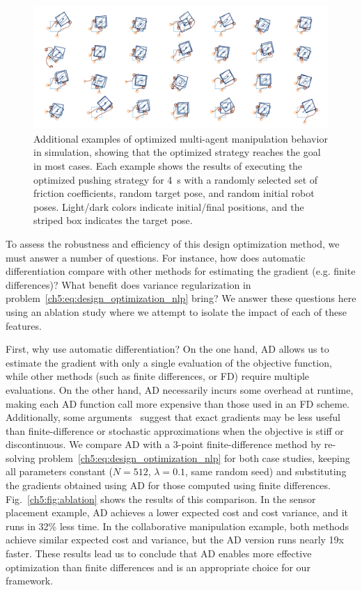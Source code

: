 \begin{figure}[t]
    \centering
    \includegraphics[width=\linewidth]{images/ch5/mam_more.png}
    \caption{Additional examples of optimized multi-agent manipulation behavior in simulation, showing that the optimized strategy reaches the goal in most cases. Each example shows the results of executing the optimized pushing strategy for \SI{4}{s} with a randomly selected set of friction coefficients, random target pose, and random initial robot poses. Light/dark colors indicate initial/final positions, and the striped box indicates the target pose.}
    \label{app:ch5:fig:mam_more}
\end{figure}

To assess the robustness and efficiency of this design optimization method, we must answer a number of questions. For instance, how does automatic differentiation compare with other methods for estimating the gradient (e.g. finite differences)? What benefit does variance regularization in problem~\eqref{ch5:eq:design_optimization_nlp} bring? We answer these questions here using an ablation study where we attempt to isolate the impact of each of these features.

First, why use automatic differentiation? On the one hand, AD allows us to estimate the gradient with only a single evaluation of the objective function, while other methods (such as finite differences, or FD) require multiple evaluations. On the other hand, AD necessarily incurs some overhead at runtime, making each AD function call more expensive than those used in an FD scheme. Additionally, some arguments~\cite{suh2021_bundled_gradients} suggest that exact gradients may be less useful than finite-difference or stochastic approximations when the objective is stiff or discontinuous. We compare AD with a 3-point finite-difference method by re-solving problem~\eqref{ch5:eq:design_optimization_nlp} for both case studies, keeping all parameters constant ($N=512$, $\lambda=0.1$, same random seed) and substituting the gradients obtained using AD for those computed using finite differences. Fig.~\ref{ch5:fig:ablation} shows the results of this comparison. In the sensor placement example, AD achieves a lower expected cost and cost variance, and it runs in 32\% less time. In the collaborative manipulation example, both methods achieve similar expected cost and variance, but the AD version runs nearly 19x faster. These results lead us to conclude that AD enables more effective optimization than finite differences and is an appropriate choice for our framework.

